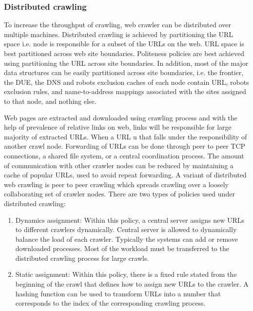 \documentclass[article,type=msc,colorback,accentcolor=tud9c,twoside,11pt]{tudthesis}
\begin{document}
\subsubsection{Distributed crawling}

To increase the throughput of crawling, web crawler can be distributed over multiple machines. Distributed crawling is achieved by partitioning the URL space i.e. node is responsible for a subset of the URLs on the web. URL space is best partitioned across web site boundaries. Politeness policies are best achieved using partitioning the URL across site boundaries. In addition, most of the major data structures can be easily partitioned across site boundaries, i.e. the frontier, the DUE, the DNS and robots exclusion caches of each node contain URL, robots exclusion rules, and name-to-address mappings associated with the sites assigned to that node, and nothing else.

Web pages are extracted and downloaded using crawling process and with the help of prevalence of relative links on web, links will be responsible for large majority of extracted URLs. When a URL u that falls under the responsibility of another crawl node. Forwarding of URLs can be done through peer to peer TCP connections\cite{Highperformancewebcrawling}, a shared file system\cite{Highperformance}, or a central coordination process\cite{anatomy}. The amount of communication with other crawler nodes can be reduced by maintaining a cache of popular URLs, used to avoid repeat forwarding\cite{Graphstructure}. A variant of distributed web crawling is peer to peer crawling which spreads crawling over a loosely collaborating set of crawler nodes. There are two types of policies used under distributed crawling:
 \begin{enumerate}
	\item Dynamics assignment: Within this policy, a central server assigns new URLs to different crawlers dynamically. Central server is allowed to dynamically balance the load of each crawler. Typically the systems can add or remove downloaded processes. Most of the workload must be transferred to the distributed crawling process for large crawls.
	\item Static assignment: Within this policy, there is a fixed rule stated from the beginning of the crawl that defines how to assign new URLs to the crawler. A hashing function can be used to transform URLs into a number that corresponds to the index of the corresponding crawling process.
\end{enumerate}
\end{document}
